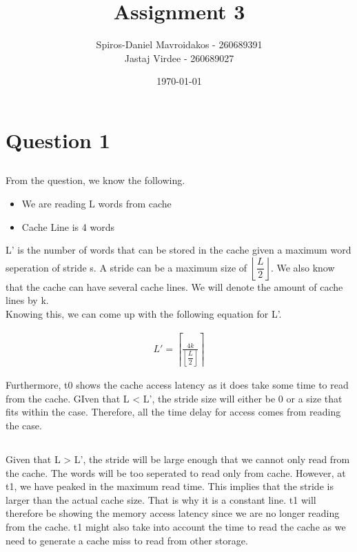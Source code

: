 \documentclass[11pt]{article}
\title{Assignment 3}
\author{Spiros-Daniel Mavroidakos - 260689391\\Jastaj Virdee - 260689027}
\date{\today}
\begin{document}
\maketitle
{}
\newpage
\tableofcontents
\newpage
{}

\section{Question 1}

\subsection{}
From the question, we know the following.
\begin{itemize}
	\item We are reading L words from cache
	\item Cache Line is 4 words
\end{itemize}
L' is the number of words that can be stored in the cache given a maximum word seperation of stride s. A stride can be a maximum size of 
$\left\lfloor\dfrac{L}{2}\right\rfloor$. We also know that the cache can have several cache lines. We will denote the amount of cache lines 
by k. \\
Knowing this, we can come up with the following equation for L'.

\begin{equation}
	\begin{split}
		L' = \left\lceil\frac{4k}{\left\lfloor\dfrac{L}{2}\right\rfloor}\right\rceil
	\end{split}
\end{equation}

Furthermore, t0 shows the cache access latency as it does take some time to read from the cache. GIven that L < L', the stride size will 
either be 0 or a size that fits within the case. Therefore, all the time delay for access comes from reading the case.

\subsection{}
Given that L > L', the stride will be large enough that we cannot only read from the cache. The words will be too seperated to read only 
from cache. However, at t1, we have peaked in the maximum read time. This implies that the stride is larger than the actual cache size. 
That is why it is a constant line. t1 will therefore be showing the memory access latency since we are no longer reading from the cache. 
t1 might also take into account the time to read the cache as we need to generate a cache miss to read from other storage.
\end{document}
